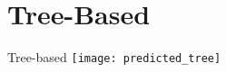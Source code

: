 \section{Tree-Based}


\begin{frame}[c]{Tree-based}
    \texttt{[image: predicted\_tree]}
\end{frame}

